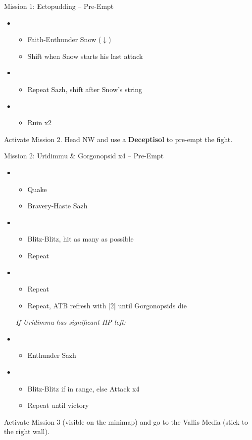 \begin{battle}{Mission 1: Ectopudding -- Pre-Empt}
	\begin{itemize}
		\item \third
			\begin{itemize}
				\item Faith-Enthunder Snow ($\downarrow$)
				\item Shift when Snow starts his last attack
			\end{itemize}
		\item \fourth
			\begin{itemize}
				\item Repeat Sazh, shift after Snow's string
			\end{itemize}
		\item \fifth
			\begin{itemize}
				\item Ruin x2
			\end{itemize}
	\end{itemize}
\end{battle}

Activate Mission 2.
Head NW and use a \textbf{Deceptisol} to pre-empt the fight.

\begin{battle}{Mission 2: Uridimmu \& Gorgonopsid x4 -- Pre-Empt}
	\begin{itemize}
		\item \third
			\begin{itemize}
				\item Quake
				\item Bravery-Haste Sazh
			\end{itemize}
		\item \second
			\begin{itemize}
				\item Blitz-Blitz, hit as many as possible
				\item Repeat
			\end{itemize}
		\item \first
			\begin{itemize}
				\item Repeat
				\item Repeat, ATB refresh with [2] until Gorgonopsids die
			\end{itemize}
		\textit{If Uridimmu has significant HP left:}
		\item \third
			\begin{itemize}
				\item Enthunder Sazh
			\end{itemize}
		\item \sixth
			\begin{itemize}
				\item Blitz-Blitz if in range, else Attack x4
				\item Repeat until victory
			\end{itemize}
	\end{itemize}
\end{battle}

Activate Mission 3 (visible on the minimap) and go to the Vallis Media (stick to the right wall).
\vfill